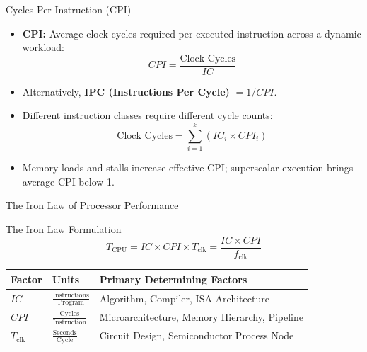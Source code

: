 \documentclass[aspectratio=169,11pt]{beamer}
\newcommand{\key}[1]{\textbf{#1}}
\begin{document}

\begin{frame}{Cycles Per Instruction (CPI)}

\begin{itemize}
  \item \key{CPI:} Average clock cycles required per executed instruction across a dynamic workload:
  $$\mathit{CPI} = \frac{\text{Clock Cycles}}{\mathit{IC}}$$
  \item Alternatively, \key{IPC (Instructions Per Cycle)} $= 1 / \mathit{CPI}$.
  \item Different instruction classes require different cycle counts:
  $$\text{Clock Cycles} = \sum_{i=1}^{k} \left( \mathit{IC}_i \times \mathit{CPI}_i \right)$$
  \item Memory loads and stalls increase effective CPI; superscalar execution brings average CPI below 1.
\end{itemize}

\end{frame}


\begin{frame}{The Iron Law of Processor Performance}

\begin{block}{The Iron Law Formulation}
$$T_{\text{CPU}} = \mathit{IC} \times \mathit{CPI} \times T_{\text{clk}} = \frac{\mathit{IC} \times \mathit{CPI}}{f_{\text{clk}}}$$
\end{block}

\begin{center}
\begin{tabular}{lll}
\toprule
\textbf{Factor} & \textbf{Units} & \textbf{Primary Determining Factors} \\
\midrule
$\mathit{IC}$ & $\frac{\text{Instructions}}{\text{Program}}$ & Algorithm, Compiler, ISA Architecture \\
$\mathit{CPI}$ & $\frac{\text{Cycles}}{\text{Instruction}}$ & Microarchitecture, Memory Hierarchy, Pipeline \\
$T_{\text{clk}}$ & $\frac{\text{Seconds}}{\text{Cycle}}$ & Circuit Design, Semiconductor Process Node \\
\bottomrule
\end{tabular}
\end{center}

\end{frame}
\end{document}
